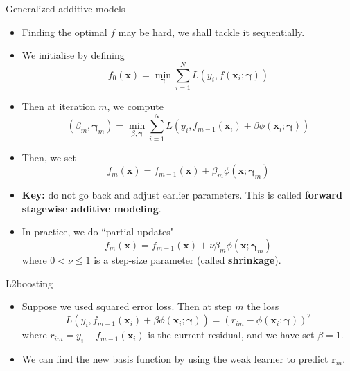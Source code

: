 \documentclass[10pt,mathserif]{beamer}
\begin{document}
\begin{frame}{Generalized additive models}
\begin{itemize}
    \item Finding the optimal $f$ may be hard, we shall tackle it sequentially. 
    \item We initialise by defining
    \begin{equation*}
        f_0(\bm{x}) = \min_{\bm{\gamma}} \sum_{i=1}^N L(y_i,f(\bm{x}_i;\bm{\gamma}))
    \end{equation*}
    \item Then at iteration $m$, we compute 
    \begin{equation*}
        (\beta_m, \bm{\gamma}_m) = \min_{\beta, \bm{\gamma}} \sum_{i=1}^N L(y_i,f_{m-1}(\bm{x}_i) + \beta\phi(\bm{x}_i; \bm{\gamma}))
    \end{equation*}
    \item Then, we set 
    \begin{equation*}
        f_m(\bm{x})= f_{m-1}(\bm{x}) + \beta_m\phi(\bm{x};\bm{\gamma}_m)
    \end{equation*}
    \item \textbf{Key:} do not go back and adjust earlier parameters. This is called \textbf{forward stagewise additive modeling}.
    \item In practice,  we do ``partial updates" 
    \begin{equation*}
        f_m(\bm{x})= f_{m-1}(\bm{x}) + \nu\beta_m\phi(\bm{x};\bm{\gamma}_m)
    \end{equation*}
    where $0 < \nu \leq 1$ is a step-size parameter (called \textbf{shrinkage}).
\end{itemize}
\end{frame}

\begin{frame}{L2boosting}
\begin{itemize}
    \item Suppose we used squared error loss. Then at step $m$ the loss
    \begin{equation*}
        L(y_i,f_{m-1}(\bm{x}_i) + \beta\phi(\bm{x}_i;\bm{\gamma})) = (r_{im} - \phi(\bm{x}_i;\bm{\gamma}))^2
    \end{equation*}
    where $r_{im} = y_i - f_{m-1}(\bm{x}_i)$ is the current residual, and we have set $\beta = 1$.
    \item We can find the new basis function by using the weak learner to predict $\bm{r}_m$.
\end{itemize}
\end{frame}
\end{document}
